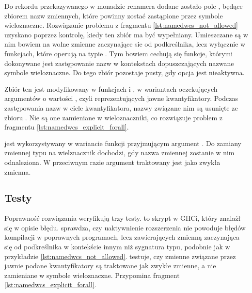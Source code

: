 Do rekordu  przekazywanego w monadzie renamera dodane zostało
pole , będące zbiorem nazw zmiennych, które powinny
zostać zastąpione przez symbole wieloznaczne. Rozwiązanie problemu z fragmentu
\ref{lst:namedwcs_not_allowed} uzyskano poprzez kontrolę, kiedy ten zbiór ma być
wypełniany. Umieszczane są w nim bowiem na wolne zmienne zaczynające sie od
podkreślnika, lecz wyłącznie w funkcjach, które operują na typie
. Tym bowiem cechują się funkcje, którymi dokonywane jest
zastępowanie nazw w kontekstach dopuszczających nazwane symbole wieloznaczne. Do
tego zbiór pozostaje pusty, gdy opcja  jest nieaktywna.

Zbiór ten jest modyfikowany w funkcjach  i , w
wariantach oczekujących argumentów o wartości , czyli
reprezentujących jawne kwantyfikatory. Podczas zastępowania nazw w ciele
kwantyfikatora, nazwy związane nim są usunięte ze zbioru . Nie są one zamieniane w wieloznaczniki, co rozwiązuje problem z
fragmentu \ref{lst:namedwcs_explicit_forall}.

 jest wykorzystywany w wariancie funkcji
 przyjmującym argument . Do zamiany zmiennej typu
na wielznacznik dochodzi, gdy nazwa zmiennej zostanie w nim odnaleziona. W
przeciwnym razie argument traktowany jest jako zwykła zmienna.

\subsection{Testy} %

Poprawność rozwiązania weryfikują trzy testy.  to skrypt w GHCi,
który znalażł się w opisie błędu.  sprawdza, czy
uaktywnienie rozszerzenia  nie powoduje błędów kompilacji w
poprawnych programach, lecz zawierających zmienną zaczynająca się od
podkreślnika w kontekście innym niż sygnatura typu, podobnie jak w przykładzie
\ref{lst:namedwcs_not_allowed}.  testuje, czy
zmienne związane przez jawnie podane kwantyfikatory są traktowane jak zwykłe
zmienne, a nie zamieniane w symbole wieloznaczne. Przypomina fragment
\ref{lst:namedwcs_explicit_forall}.
